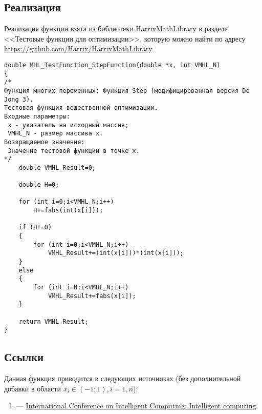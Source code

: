 \subsection {Реализация}

Реализация функции взята из библиотеки HarrixMathLibrary в разделе <<Тестовые функции для оптимизации>>, которую можно найти по адресу \href{https://github.com/Harrix/HarrixMathLibrary} {https://github.com/Harrix/HarrixMathLibrary}.

\begin{lstlisting}[caption=Код функции MHL\_TestFunction\_StepFunction]
double MHL_TestFunction_StepFunction(double *x, int VMHL_N)
{
/*
Функция многих переменных: Функция Step (модифицированная версия De Jong 3).
Тестовая функция вещественной оптимизации.
Входные параметры:
 x - указатель на исходный массив;
 VMHL_N - размер массива x.
Возвращаемое значение:
 Значение тестовой функции в точке x.
*/
    double VMHL_Result=0;

    double H=0;

    for (int i=0;i<VMHL_N;i++)
        H+=fabs(int(x[i]));

    if (H!=0)
    {
        for (int i=0;i<VMHL_N;i++)
            VMHL_Result+=(int(x[i]))*(int(x[i]));
    }
    else
    {
        for (int i=0;i<VMHL_N;i++)
            VMHL_Result+=fabs(x[i]);
    }

    return VMHL_Result;
}
\end{lstlisting}

\subsection {Ссылки}

Данная функция приводится в следующих источниках (без дополнительной добавки в области $\bar{x}_i \in \left( -1; 1\right), i=\overline{1,n} $):

\begin{enumerate}
\item \cite[стр. 729]{book:huang2006international} ---  \href{http://books.google.ru/books?id=7sH4RsXYu7cC}{International Conference on Intelligent Computing: Intelligent computing}.
\end{enumerate}